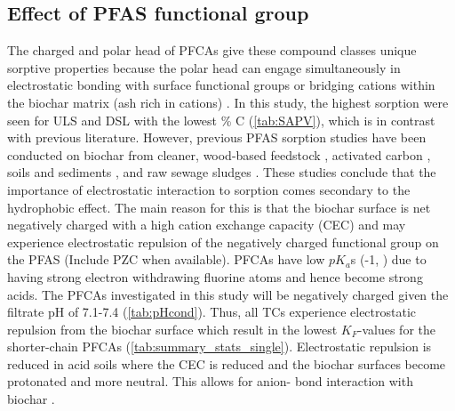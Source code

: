 \subsection{Effect of PFAS functional group} 
The charged and polar head of PFCAs give these compound classes unique sorptive properties because the polar head can engage simultaneously in electrostatic bonding with surface functional groups or bridging cations within the biochar matrix (ash rich in cations) \citep{zhang2013sorption,sigmund2022sorption}. In this study, the highest sorption were seen for ULS and DSL with the lowest \% C (\cref{tab:SAPV}), which is in contrast with previous literature. However, previous PFAS sorption studies have been conducted on biochar from cleaner, wood-based feedstock \citep{Sormo2021}, activated carbon \citep{zhang2021sorption,Kupryianchyk2016b}, soils and sediments \citep{higgins2006sorption}, and raw sewage sludges \citep{zhang2013sorption}. These studies conclude that the importance of electrostatic interaction to sorption comes secondary to the hydrophobic effect. The main reason for this is that the biochar surface is net negatively charged with a high cation exchange capacity (CEC) \citep{Ahmad2014} and may experience electrostatic repulsion of the negatively charged functional group on the PFAS (Include PZC when available). PFCAs have low $pK_a$s (-1, \citep{goss2008pKa}) due to having strong electron withdrawing fluorine atoms and hence become strong acids. The PFCAs investigated in this study will be negatively charged given the filtrate pH of 7.1-7.4 (\cref{tab:pHcond}). Thus, all TCs experience electrostatic repulsion from the biochar surface which result in the lowest $K_F$-values for the shorter-chain PFCAs (\cref{tab:summary_stats_single}). Electrostatic repulsion is reduced in acid soils where the CEC is reduced and the biochar surfaces become protonated and more neutral. This allows for anion- \textpi bond interaction with biochar \citep{sigmund2022sorption}. 

